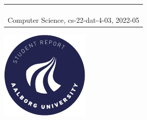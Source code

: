 \begin{titlepage}
{{\begin{tabular}{@{}p{\textwidth}@{}}
\begin{center}
{      }
    \end{center}
    \vspace{0.2cm}
   \begin{center}
    {\Large
      Christoffer Trebbien Jønsson, Daniel Runge Petersen, Gustav Svante Grønkjær Graversen, Jamie Lee Smith Hammer, Lars Emanuel Hansen, Sebastian Aaholm%
    }\\
    \vspace{0.2cm}
    {\large
      Computer Science, cs-22-dat-4-03, 2022-05%
    }
   \end{center}
   \vspace{0.2cm}
   \begin{center}
    {\Large
      Semester Project
    }
   \end{center}
  \end{tabular}}}
  \vfill
  \begin{center}
    \includegraphics[width=0.2\paperwidth]{AAUgraphics/aau_logo_circle_en}%
  \end{center}
\end{titlepage}
\clearpage
